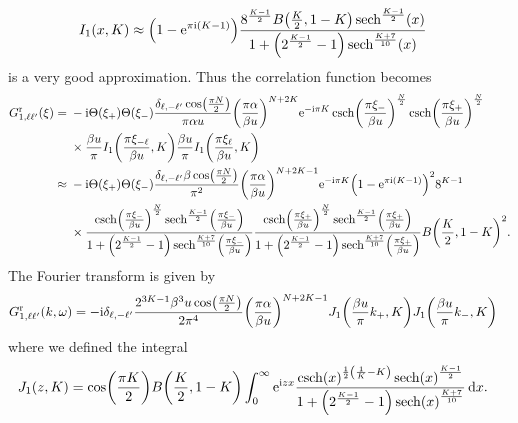 \documentclass[english, parskip=full]{scrartcl}
\begin{document}
\begin{align}
I_1(x,K) &\approx \kla*{1 - \powe{\pi\i (K-1)}} \frac{8^\frac{K-1}{2} B\kla*{\frac{K}{2}, 1-K} \sech^\frac{K-1}{2}(x)}{1 + \kla*{2^\frac{K-1}{2} - 1} \sech^\frac{K+7}{10}(x)}
\end{align}
is a very good approximation.
Thus the correlation function becomes
\begin{align}
G_{1,\ell\ell'}^\r(\xi) &= \bsplit{&-\i\Theta(\xi_+)\Theta(\xi_-) \frac{\delta_{\ell,-\ell'}\cos\kla*{\frac{\pi N}{2}}}{\pi\alpha u} \kla*{\frac{\pi\alpha}{\beta u}}^{N+2K} \powe{-\i\pi K} \csch\kla*{\frac{\pi \xi_-}{\beta u}}^\frac{N}{2} \csch\kla*{\frac{\pi \xi_+}{\beta u}}^\frac{N}{2}\\
&\times \frac{\beta u}{\pi} I_1\kla*{\frac{\pi\xi_{-\ell}}{\beta u}, K} \frac{\beta u}{\pi} I_1\kla*{\frac{\pi\xi_\ell}{\beta u}, K} }\\
&\approx \bsplit{&-\i\Theta(\xi_+)\Theta(\xi_-) \frac{\delta_{\ell,-\ell'}\beta \cos\kla*{\frac{\pi N}{2}}}{\pi^2} \kla*{\frac{\pi\alpha}{\beta u}}^{N+2K-1} \powe{-\i\pi K} \kla*{1 - \powe{\pi\i (K-1)}}^2 8^{K-1} \\
&\times \frac{\csch\kla*{\frac{\pi \xi_-}{\beta u}}^\frac{N}{2} \sech^\frac{K-1}{2}\kla*{\frac{\pi\xi_{-}}{\beta u}}}{1 + \kla*{2^\frac{K-1}{2} - 1} \sech^\frac{K+7}{10}\kla*{\frac{\pi\xi_{-}}{\beta u}}} \frac{\csch\kla*{\frac{\pi \xi_+}{\beta u}}^\frac{N}{2} \sech^\frac{K-1}{2}\kla*{\frac{\pi\xi_{+}}{\beta u}}}{1 + \kla*{2^\frac{K-1}{2} - 1} \sech^\frac{K+7}{10}\kla*{\frac{\pi\xi_{+}}{\beta u}}} B\kla*{\frac{K}{2}, 1-K}^2. }
\end{align}
The Fourier transform is given by
\begin{align}
G_{1,\ell\ell'}^\r(k,\omega) &= -\i \delta_{\ell,-\ell'} \frac{2^{3K-1} \beta^3u \cos\kla*{\frac{\pi N}{2}}}{2\pi^4} \kla*{\frac{\pi\alpha}{\beta u}}^{N+2K-1} J_1\kla*{\frac{\beta u}{\pi}k_+, K} J_1\kla*{\frac{\beta u}{\pi}k_-, K}
\end{align}
where we defined the integral
\begin{align}
J_1(z,K) &= \cos\kla*{\frac{\pi K}{2}} B\kla*{\frac{K}{2}, 1-K} \intx{0}{\infty}{\powe{\i zx} \frac{\csch(x)^{\frac{1}{2} \kla*{\frac{1}{K} - K}} \sech(x)^\frac{K-1}{2}}{1 + \kla*{2^\frac{K-1}{2} - 1} \sech(x)^\frac{K+7}{10}} }{x}.
\end{align}

\end{document}

